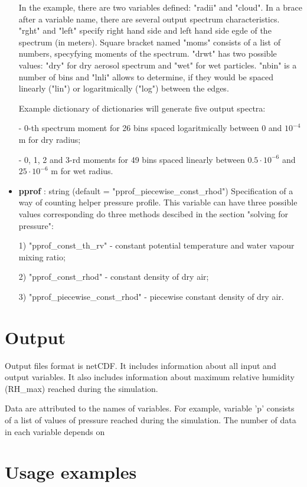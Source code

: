 \documentclass[11pt]{article}
\begin{document}
\begin{itemize}
In the example, there are two variables defined: "radii" and "cloud". In a brace after a variable name, there are several output spectrum characteristics. "rght" and "left" specify right hand side and left hand side egde of the spectrum (in meters). Square bracket named "moms" consists of a list of numbers, specyfying moments of the spectrum. "drwt" has two possible values: "dry" for dry aerosol spectrum and "wet" for wet particles. "nbin" is a number of bins and "lnli" allows to determine, if they would be spaced linearly ("lin") or logaritmically ("log") between the edges.

Example dictionary of dictionaries will generate five output spectra:

- 0-th spectrum moment for 26 bins spaced logaritmically between 0 and $10^{-4}$ m for dry radius;

- 0, 1, 2 and 3-rd moments for 49 bins spaced linearly between $0.5\cdot10^{-6}$ and $25\cdot10^{-6}$ m for wet radius.

\item \textbf{pprof} : string (default = "pprof\_piecewise\_const\_rhod") \newline Specification of a way of counting helper pressure profile. This variable can have three possible values corresponding do three methods descibed in the section "solving for pressure":

1) "pprof\_const\_th\_rv" - constant potential temperature and water vapour mixing ratio;

2) "pprof\_const\_rhod" - constant density of dry air;

3) "pprof\_piecewise\_const\_rhod" - piecewise constant density of dry air.

\end{itemize}

\section{Output}

Output files format is netCDF. It includes information about all input and output variables. It also includes information about maximum relative humidity (RH\_max) reached during the simulation.

Data are attributed to the names of variables. For example, variable 'p' consists of a list of values of pressure reached during the simulation. The number of data in each variable depends on 

\section{Usage examples}
\end{document}
